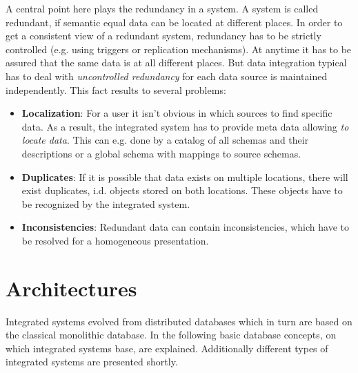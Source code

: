A central point here plays the redundancy in a system. A system is called redundant, if semantic equal data can be located at different places. In order to get a consistent view of a redundant system, redundancy has to be strictly controlled (e.g. using triggers or replication mechanisms). At anytime it has to be assured that the same data is at all different places. But data integration typical has to deal with \textit{uncontrolled redundancy} for each data source is maintained independently. This fact results to several problems:
\begin{itemize}
\item \textbf{Localization}: For a user it isn't obvious in which sources to find specific data. As a result, the integrated system has to provide meta data allowing \textit{to locate data}. This can e.g. done by a catalog of all schemas and their descriptions or a global schema with mappings to source schemas.
\item \textbf{Duplicates}: If it is possible that data exists on multiple locations, there will exist duplicates, i.d. objects stored on both locations. These objects have to be recognized by the integrated system.
\item \textbf{Inconsistencies}: Redundant data can contain inconsistencies, which have to be resolved for a homogeneous presentation.
\end{itemize}

\section{Architectures}

Integrated systems evolved from distributed databases which in turn are based on the classical monolithic database. In the following basic database concepts, on which integrated systems base, are explained. Additionally different types of integrated systems are presented shortly.

